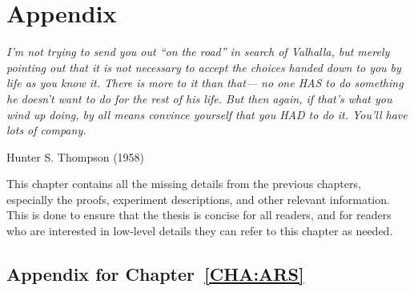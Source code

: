 
\chapter{Appendix}
\label{cha:appendix}

\epigraph{\textit{I'm not trying to send you out “on the road” in
    search of Valhalla, but merely pointing out that it is not
    necessary to accept the choices handed down to you by life as you
    know it. There is more to it than that— no one HAS to do something
    he doesn't want to do for the rest of his life. But then again, if
    that's what you wind up doing, by all means convince yourself that
    you HAD to do it. You'll have lots of company.}}{Hunter
  S. Thompson (1958)}

This chapter contains all the missing details from the previous chapters,
especially the proofs, experiment descriptions, and other relevant information.
This is done to ensure that the thesis is concise for all readers, and for
readers who are interested in low-level details they can refer to this chapter
as needed.

\section{Appendix for Chapter~\ref{CHA:ARS}}
\label{sec:append-chapt-ars}

